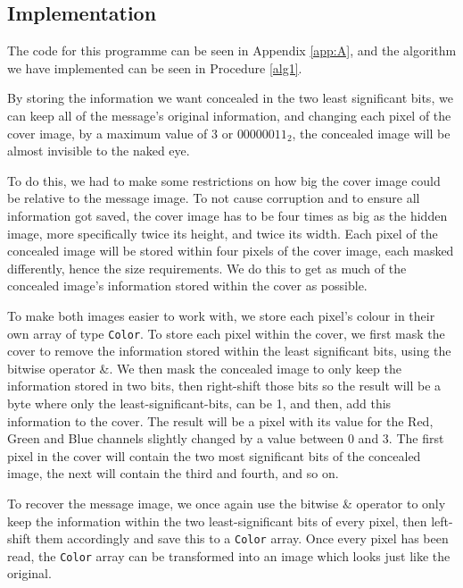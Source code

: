 \subsection{Implementation}
\label{sec:lsb-implementation}

The code for this programme can be seen in Appendix \ref{app:A}, and the algorithm we have implemented can be seen in Procedure \ref{alg1}.

By storing the information we want concealed in the two least significant bits, we can keep all of the message's original information, and changing each pixel of the cover image, by a maximum value of 3 or $00000011_2$, the concealed image will be almost invisible to the naked eye.

To do this, we had to make some restrictions on how big the cover image could be relative to the message image.
To not cause corruption and to ensure all information got saved, the cover image has to be four times as big as the hidden image, more specifically twice its height, and twice its width.
Each pixel of the concealed image will be stored within four pixels of the cover image, each masked differently, hence the size requirements.
We do this to get as much of the concealed image's information stored within the cover as possible.

To make both images easier to work with, we store each pixel's colour in their own array of type \lstinline|Color|.
To store each pixel within the cover, we first mask the cover to remove the information stored within the least significant bits, using the bitwise operator \&.
We then mask the concealed image to only keep the information stored in two bits, then right-shift those bits so the result will be a byte where only the least-significant-bits, can be 1, and then, add this information to the cover.
The result will be a pixel with its value for the Red, Green and Blue channels slightly changed by a value between 0 and 3.
The first pixel in the cover will contain the two most significant bits of the concealed image, the next will contain the third and fourth, and so on.

To recover the message image, we once again use the bitwise \& operator to only keep the information within the two least-significant bits of every pixel, then left-shift them accordingly and save this to a \lstinline|Color| array.
Once every pixel has been read, the \lstinline|Color| array can be transformed into an image which looks just like the original.

